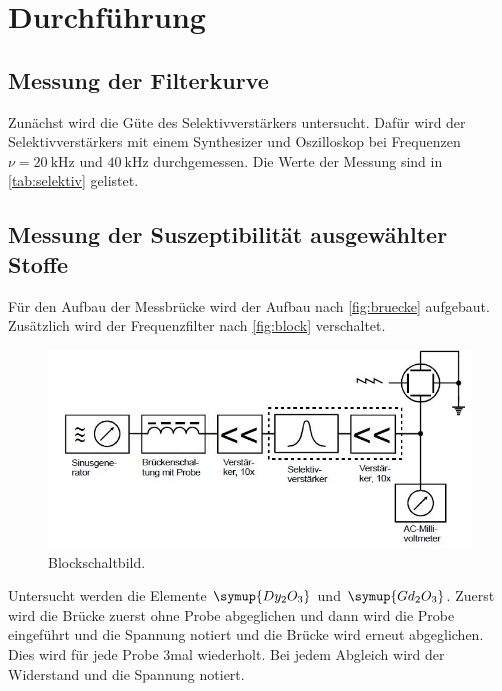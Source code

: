 \section{Durchführung}

\subsection{Messung der Filterkurve}
Zunächst wird die Güte des Selektivverstärkers untersucht. Dafür wird der Selektivverstärkers mit einem Synthesizer und Oszilloskop bei Frequenzen $\nu = \SI{20}{\kilo\hertz}$ und
$\SI{40}{\kilo\hertz}$ durchgemessen. Die Werte der Messung sind in \autoref{tab:selektiv} gelistet.

\subsection{Messung der Suszeptibilität ausgewählter Stoffe} 
Für den Aufbau der Messbrücke wird der Aufbau nach \autoref{fig:bruecke} aufgebaut. Zusätzlich wird der Frequenzfilter nach \autoref{fig:block} verschaltet.
\begin{figure} [H]
    \centering
    \includegraphics[scale=0.75]{Bilder/Blockschaltbild.jpg}
    \caption{Blockschaltbild. \cite{V606}}
    \label{fig:block}
\end{figure}

\noindent
Untersucht werden die Elemente $\symup{Dy_2O_3}$ und $\symup{Gd_2O_3}$.
Zuerst wird die Brücke zuerst ohne Probe abgeglichen und dann wird die Probe eingeführt und die Spannung notiert und die Brücke wird erneut abgeglichen. Dies wird für jede
Probe 3mal wiederholt. Bei jedem Abgleich wird der Widerstand und die Spannung notiert.


